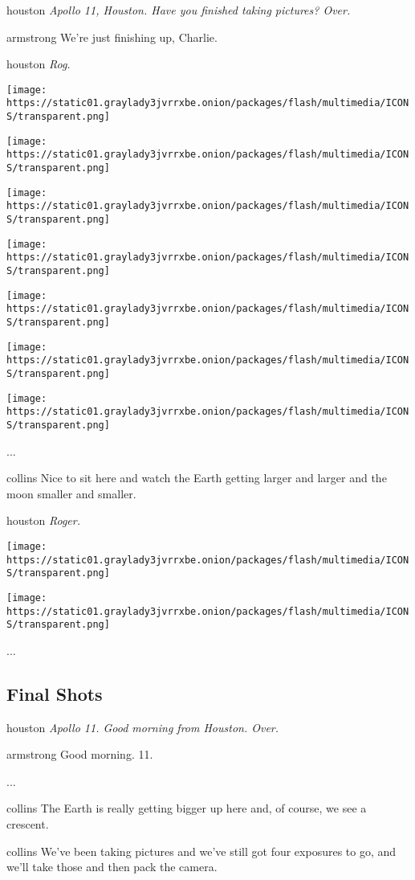 houston \emph{Apollo 11, Houston. Have you finished taking pictures?
Over.}

armstrong We're just finishing up, Charlie.

houston \emph{Rog.}

\texttt{[image: https://static01.graylady3jvrrxbe.onion/packages/flash/multimedia/ICONS/transparent.png]}

\texttt{[image: https://static01.graylady3jvrrxbe.onion/packages/flash/multimedia/ICONS/transparent.png]}

\texttt{[image: https://static01.graylady3jvrrxbe.onion/packages/flash/multimedia/ICONS/transparent.png]}

\texttt{[image: https://static01.graylady3jvrrxbe.onion/packages/flash/multimedia/ICONS/transparent.png]}

\texttt{[image: https://static01.graylady3jvrrxbe.onion/packages/flash/multimedia/ICONS/transparent.png]}

\texttt{[image: https://static01.graylady3jvrrxbe.onion/packages/flash/multimedia/ICONS/transparent.png]}

\texttt{[image: https://static01.graylady3jvrrxbe.onion/packages/flash/multimedia/ICONS/transparent.png]}

...

collins Nice to sit here and watch the Earth getting larger and larger
and the moon smaller and smaller.

houston \emph{Roger.}

\texttt{[image: https://static01.graylady3jvrrxbe.onion/packages/flash/multimedia/ICONS/transparent.png]}

\texttt{[image: https://static01.graylady3jvrrxbe.onion/packages/flash/multimedia/ICONS/transparent.png]}

...

\hypertarget{-final-shots-}{%
\subsection{ Final Shots }\label{-final-shots-}}

houston \emph{Apollo 11. Good morning from Houston. Over.}

armstrong Good morning. 11.

...

collins The Earth is really getting bigger up here and, of course, we
see a crescent.

collins We've been taking pictures and we've still got four exposures to
go, and we'll take those and then pack the camera.

